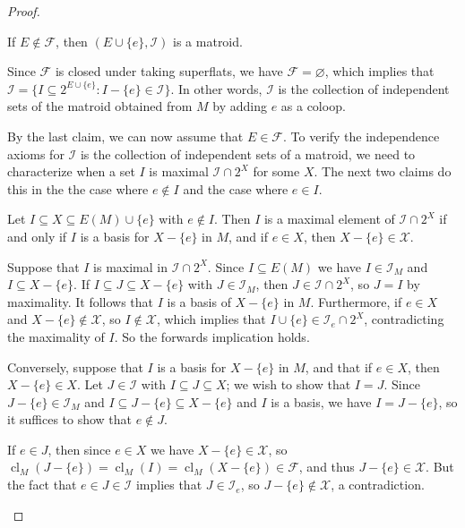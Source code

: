 \documentclass[10pt,a4paper]{amsart}
\newcommand{\cF}{\mathcal{F}}
\newcommand{\cI}{\mathcal{I}}
\newcommand{\cX}{\mathcal{X}}
\DeclareMathOperator{\cl}{cl}
\newcommand{\es}{\varnothing}
\renewcommand{\ss}{\subseteq}
\begin{document}
\begin{proof}
  \begin{claim}\label{notcoloop}
    If $E \notin \cF$, then $(E \cup \{e\}, \cI)$ is a matroid. 
  \end{claim}
  \begin{subproof}
    Since $\cF$ is closed under taking superflats, we have $\cF = \es$, which implies
    that $\cI = \{I \ss 2^{E \cup \{e\}} : I - \{e\} \in \cI\}$. In other words, 
    $\cI$ is the collection of independent sets of the matroid obtained from $M$ by adding 
    $e$ as a coloop. 
  \end{subproof}


  By the last claim, we can now assume that $E \in \cF$. To verify the independence axioms for $\cI$ 
  is the collection of independent sets of a matroid, we need to characterize 
  when a set $I$ is maximal $\cI \cap 2^X$ for some $X$. The next two claims
  do this in the the case where $e \notin I$ and the case where $e \in I$. 


  \begin{claim}\label{foo1}
    Let $I \ss X \ss E(M) \cup \{e\}$ with $e \notin I$.
    Then $I$ is a maximal element of $\cI \cap 2^X$ if and only if 
    $I$ is a basis for $X - \{e\}$ in $M$, and if $e \in X$, then $X - \{e\} \in \cX$. 
  \end{claim}
  \begin{subproof}
    Suppose that $I$ is maximal in $\cI \cap 2^X$. Since $I \subseteq E(M)$ we have 
    $I \in \cI_M$ and $I \ss X - \{e\}$. If $I \subseteq J \subseteq X - \{e\}$ with $J \in \cI_M$, 
    then $J \in \cI \cap 2^X$, so $J = I$ by maximality. It follows that $I$ is a basis of $X - \{e\}$ in $M$. Furthermore, if $e \in X$ and $X - \{e\} \notin \cX$, so $I \notin \cX$, 
    which implies that $I \cup \{e\} \in \cI_e \cap 2^X$, contradicting the maximality of $I$. 
    So the forwards implication holds. 
    
    Conversely, suppose that $I$ is a basis for $X - \{e\}$ in $M$, and that if $e \in X$, then $X - \{e\} \in X$. Let $J \in \cI$ with $I \ss J \ss X$; we wish to show that $I = J$. 
    Since $J - \{e\} \in \cI_M$
    and $I \ss J - \{e\} \ss X - \{e\}$ and $I$ is a basis, we have $I = J - \{e\}$, 
    so it suffices to show that $e \notin J$. 
    
    If $e \in J$, then since $e \in X$ we have $X - \{e\} \in \cX$, 
    so $\cl_M(J - \{e\}) = \cl_M(I) = \cl_M(X - \{e\}) \in \cF$, and thus $J - \{e\} \in \cX$. 
    But the fact that $e \in J \in \cI$ implies that $J \in \cI_e$, so $J - \{e\} \notin \cX$, 
    a contradiction. 
  \end{subproof}


\end{proof}
\end{document}
